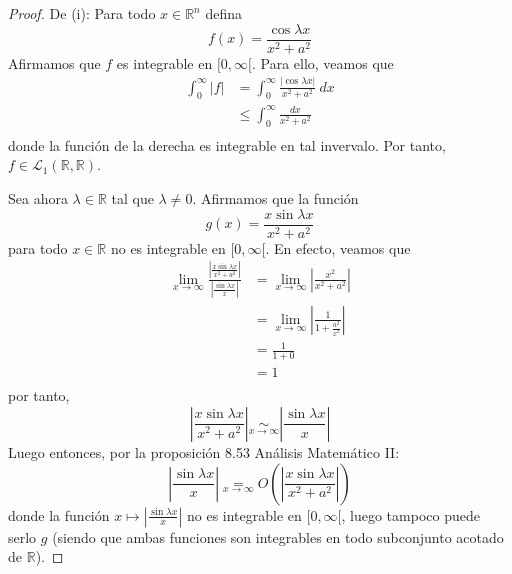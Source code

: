 \documentclass[12pt]{report}
\newcounter{it}
\theoremstyle{largebreak}
\renewcommand{\leq}{\ensuremath{\leqslant}}
\newcommand\abs[1]{\ensuremath{\left|#1\right|}}
\begin{document}
    \begin{proof}
        De (i): Para todo $x\in\mathbb{R}^n$ defina
        \begin{equation*}
            f(x)=\frac{\cos\lambda x}{x^2+a^2}
        \end{equation*}
        Afirmamos que $f$ es integrable en $[0,\infty[$. Para ello, veamos que
        \begin{equation*}
            \begin{split}
                \int_{0}^{\infty}\abs{f}&=\int_{0}^{\infty}\frac{\abs{\cos\lambda x}}{x^2+a^2}\:dx\\
                &\leq\int_{0}^\infty\frac{dx}{x^2+a^2}\\
            \end{split}
        \end{equation*}
        donde la función de la derecha es integrable en tal invervalo. Por tanto, $f\in\mathcal{L}_1(\mathbb{R},\mathbb{R})$.

        Sea ahora $\lambda\in\mathbb{R}$ tal que $\lambda\neq0$. Afirmamos que la función
        \begin{equation*}
            g(x)=\frac{x\sin\lambda x}{x^2+a^2}
        \end{equation*}
        para todo $x\in\mathbb{R}$ no es integrable en $[0,\infty[$. En efecto, veamos que
        \begin{equation*}
            \begin{split}
                \lim_{ x\rightarrow\infty}\frac{\abs{\frac{x\sin\lambda x}{x^2+a^2}}}{\abs{\frac{\sin\lambda x}{x}}}&=\lim_{ x\rightarrow\infty}\abs{\frac{x^2}{x^2+a^2}}\\
                &=\lim_{ x\rightarrow\infty}\abs{\frac{1}{1+\frac{a^2}{x^2}}}\\
                &=\frac{1}{1+0}\\
                &=1\\
            \end{split}
        \end{equation*}
        por tanto,
        \begin{equation*}
            \abs{\frac{x\sin\lambda x}{x^2+a^2}}\underset{x\rightarrow\infty}{\sim}\abs{\frac{\sin\lambda x}{x}}
        \end{equation*}
        Luego entonces, por la proposición 8.53 Análisis Matemático II:
        \begin{equation*}
            \abs{\frac{\sin\lambda x}{x}}\underset{x\rightarrow\infty}{=}O\left(\abs{\frac{x\sin\lambda x}{x^2+a^2}}\right)
        \end{equation*}
        donde la función $x\mapsto\abs{\frac{\sin\lambda x}{x}}$ no es integrable en $[0,\infty[$, luego tampoco puede serlo $g$ (siendo que ambas funciones son integrables en todo subconjunto acotado de $\mathbb{R}$).


\end{proof}
\end{document}
